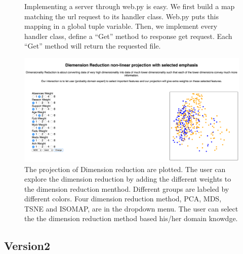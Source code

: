 \documentclass{article}
\begin{document}
\begin{description}
\begin{figure}[H]
\caption{ Implementing a server through web.py is easy. We first build a map matching the url request to its handler class. Web.py puts this mapping in a global tuple variable. Then, we implement every handler class, define a ``Get'' method to response get request. Each ``Get'' method will return the requested file.}
\end{figure}

\begin{figure}[H]
\centering
\includegraphics[scale=0.4]{4dr.png}
\caption{The projection of Dimension reduction are plotted. The user can explore the dimension reduction by adding the different weights to the dimension reduction menthod. Different groups are labeled by different colors. Four dimension reduction method, PCA, MDS, TSNE and  ISOMAP, are in the dropdown menu. The user can select the the dimension reduction method based his/her domain knowdge.}
\end{figure}
\end{description}

\subsection{Version2}
\end{document}
